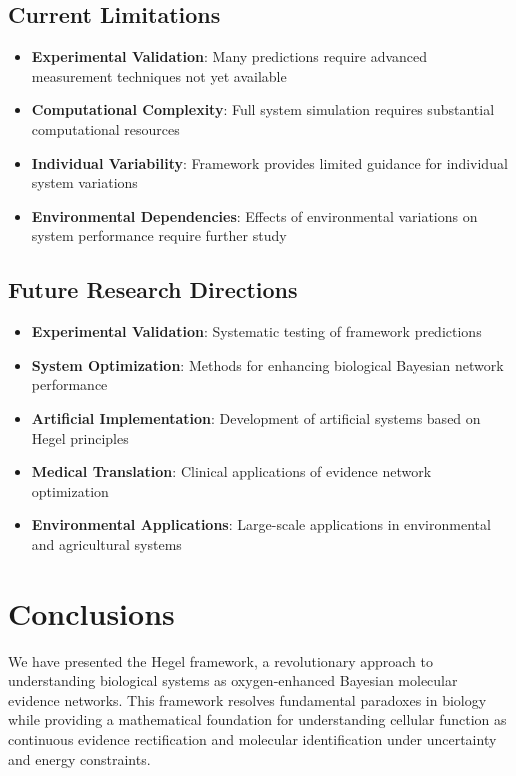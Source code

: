 \documentclass[12pt,a4paper]{article}
\begin{document}
\subsection{Current Limitations}

\begin{itemize}
\item \textbf{Experimental Validation}: Many predictions require advanced measurement techniques not yet available
\item \textbf{Computational Complexity}: Full system simulation requires substantial computational resources
\item \textbf{Individual Variability}: Framework provides limited guidance for individual system variations
\item \textbf{Environmental Dependencies}: Effects of environmental variations on system performance require further study
\end{itemize}

\subsection{Future Research Directions}

\begin{itemize}
\item \textbf{Experimental Validation}: Systematic testing of framework predictions
\item \textbf{System Optimization}: Methods for enhancing biological Bayesian network performance
\item \textbf{Artificial Implementation}: Development of artificial systems based on Hegel principles
\item \textbf{Medical Translation}: Clinical applications of evidence network optimization
\item \textbf{Environmental Applications}: Large-scale applications in environmental and agricultural systems
\end{itemize}

\section{Conclusions}

We have presented the Hegel framework, a revolutionary approach to understanding biological systems as oxygen-enhanced Bayesian molecular evidence networks. This framework resolves fundamental paradoxes in biology while providing a mathematical foundation for understanding cellular function as continuous evidence rectification and molecular identification under uncertainty and energy constraints.
\end{document}
